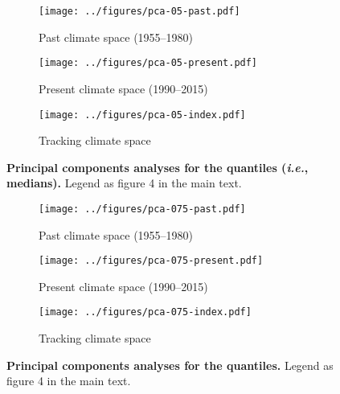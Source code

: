 \documentclass[12pt]{report}
\begin{document}
\begin{figure}[h!]
  \begin{center}
    \begin{subfigure}{.45\textwidth}
      \texttt{[image: ../figures/pca-05-past.pdf]}
      \caption{Past climate space (1955--1980)}
    \end{subfigure}
    \begin{subfigure}{.45\textwidth}
      \texttt{[image: ../figures/pca-05-present.pdf]}
      \caption{Present climate space (1990--2015)}
    \end{subfigure}
    \begin{subfigure}{.45\textwidth}
      \texttt{[image: ../figures/pca-05-index.pdf]}
      \caption{Tracking climate space}
    \end{subfigure}
  \end{center}
  \caption{\doublespacing \textbf{Principal components analyses for
      the  quantiles (\emph{i.e.}, medians).} Legend as figure
    4 in the main text.}
  \label{pca}
\end{figure}
\begin{figure}[h!]
  \begin{center}
    \begin{subfigure}{.45\textwidth}
      \texttt{[image: ../figures/pca-075-past.pdf]}
      \caption{Past climate space (1955--1980)}
    \end{subfigure}
    \begin{subfigure}{.45\textwidth}
      \texttt{[image: ../figures/pca-075-present.pdf]}
      \caption{Present climate space (1990--2015)}
    \end{subfigure}
    \begin{subfigure}{.45\textwidth}
      \texttt{[image: ../figures/pca-075-index.pdf]}
      \caption{Tracking climate space}
    \end{subfigure}
  \end{center}
  \caption{\doublespacing \textbf{Principal components analyses for
      the  quantiles.} Legend as figure 4 in the main text.}
  \label{pca}
\end{figure}
\end{document}
